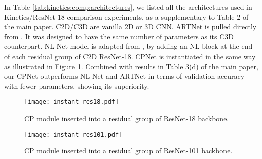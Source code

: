 \documentclass[10pt,twocolumn,letterpaper]{article}
\begin{document}
In Table \ref{tab:kinetics:comp:architectures}, we listed all the architectures used in Kinetics/ResNet-18 comparison experiments, as a supplementary to Table 2 of the main paper. C2D/C3D are vanilla 2D or 3D CNN. ARTNet is pulled directly from \cite{ARTNet}. It was designed to have the same number of parameters as its C3D counterpart. NL Net model is adapted from \cite{NLNet}, by adding an NL block at the end of each residual group of C2D ResNet-18. CPNet is instantiated in the same way as illustrated in Figure \ref{fig:instant_res18}. Combined with results in Table 3(d) of the main paper, our CPNet outperforms NL Net and ARTNet in terms of validation accuracy with fewer parameters, showing its superiority.


\begin{figure}[t]
\centering
\texttt{[image: instant\_res18.pdf]}
\caption{CP module inserted into a residual group of ResNet-18 backbone.}
\vspace{-2ex}
\label{fig:instant_res18}
\vspace{-0ex}
\end{figure}
\begin{figure}[t]
\centering
\texttt{[image: instant\_res101.pdf]}
\caption{CP module inserted into a residual group of ResNet-101 backbone.}
\vspace{-2ex}
\label{fig:instant_res101}
\vspace{-0ex}
\end{figure}
\end{document}
